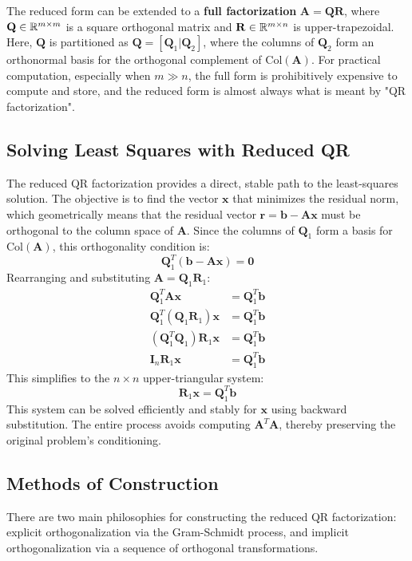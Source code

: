 \begin{remark}
The reduced form can be extended to a \textbf{full factorization} $\mathbf{A} = \mathbf{Q}\mathbf{R}$, where $\mathbf{Q} \in \mathbb{R}^{m \times m}$ is a square orthogonal matrix and $\mathbf{R} \in \mathbb{R}^{m \times n}$ is upper-trapezoidal. Here, $\mathbf{Q}$ is partitioned as $\mathbf{Q} = [\mathbf{Q}_1 | \mathbf{Q}_2]$, where the columns of $\mathbf{Q}_2$ form an orthonormal basis for the orthogonal complement of $\text{Col}(\mathbf{A})$. For practical computation, especially when $m \gg n$, the full form is prohibitively expensive to compute and store, and the reduced form is almost always what is meant by "QR factorization".
\end{remark}

\subsection{Solving Least Squares with Reduced QR}
The reduced QR factorization provides a direct, stable path to the least-squares solution. The objective is to find the vector $\mathbf{x}$ that minimizes the residual norm, which geometrically means that the residual vector $\mathbf{r} = \mathbf{b} - \mathbf{A}\mathbf{x}$ must be orthogonal to the column space of $\mathbf{A}$.
Since the columns of $\mathbf{Q}_1$ form a basis for $\text{Col}(\mathbf{A})$, this orthogonality condition is:
\[ \mathbf{Q}_1^T (\mathbf{b} - \mathbf{A}\mathbf{x}) = \mathbf{0} \]
Rearranging and substituting $\mathbf{A} = \mathbf{Q}_1\mathbf{R}_1$:
\begin{align*}
    \mathbf{Q}_1^T\mathbf{A}\mathbf{x} &= \mathbf{Q}_1^T\mathbf{b} \\
    \mathbf{Q}_1^T(\mathbf{Q}_1\mathbf{R}_1)\mathbf{x} &= \mathbf{Q}_1^T\mathbf{b} \\
    (\mathbf{Q}_1^T\mathbf{Q}_1)\mathbf{R}_1\mathbf{x} &= \mathbf{Q}_1^T\mathbf{b} \\
    \mathbf{I}_n \mathbf{R}_1\mathbf{x} &= \mathbf{Q}_1^T\mathbf{b}
\end{align*}
This simplifies to the $n \times n$ upper-triangular system:
\[ \mathbf{R}_1\mathbf{x} = \mathbf{Q}_1^T\mathbf{b} \]
This system can be solved efficiently and stably for $\mathbf{x}$ using backward substitution. The entire process avoids computing $\mathbf{A}^T\mathbf{A}$, thereby preserving the original problem's conditioning.

\subsection{Methods of Construction}
There are two main philosophies for constructing the reduced QR factorization: explicit orthogonalization via the Gram-Schmidt process, and implicit orthogonalization via a sequence of orthogonal transformations.

